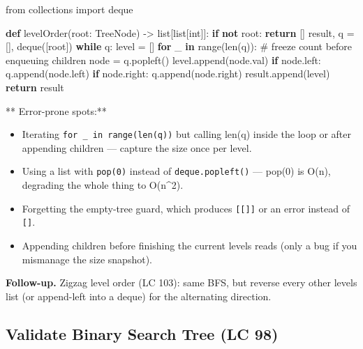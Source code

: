 \documentclass[11pt]{article}
\providecommand{\tightlist}{\setlength{\itemsep}{1pt}\setlength{\parskip}{0pt}}
\newenvironment{Shaded}{\begin{snugshade}}{\end{snugshade}}
\newcommand{\BuiltInTok}[1]{\textcolor[rgb]{0.50,0.55,0.55}{#1}}
\newcommand{\CommentTok}[1]{\textcolor[rgb]{0.48,0.49,0.49}{#1}}
\newcommand{\ControlFlowTok}[1]{\textcolor[rgb]{0.99,0.74,0.29}{\textbf{#1}}}
\newcommand{\ImportTok}[1]{\textcolor[rgb]{0.15,0.68,0.38}{#1}}
\newcommand{\KeywordTok}[1]{\textcolor[rgb]{0.81,0.81,0.76}{\textbf{#1}}}
\newcommand{\NormalTok}[1]{\textcolor[rgb]{0.81,0.81,0.76}{#1}}
\newcommand{\OperatorTok}[1]{\textcolor[rgb]{0.81,0.81,0.76}{#1}}
\begin{document}
\begin{Shaded}
\begin{Highlighting}[]
\ImportTok{from}\NormalTok{ collections }\ImportTok{import}\NormalTok{ deque}

\KeywordTok{def}\NormalTok{ levelOrder(root: TreeNode) }\OperatorTok{{-}\textgreater{}} \BuiltInTok{list}\NormalTok{[}\BuiltInTok{list}\NormalTok{[}\BuiltInTok{int}\NormalTok{]]:}
    \ControlFlowTok{if} \KeywordTok{not}\NormalTok{ root:}
        \ControlFlowTok{return}\NormalTok{ []}
\NormalTok{    result, q }\OperatorTok{=}\NormalTok{ [], deque([root])}
    \ControlFlowTok{while}\NormalTok{ q:}
\NormalTok{        level }\OperatorTok{=}\NormalTok{ []}
        \ControlFlowTok{for}\NormalTok{ \_ }\KeywordTok{in} \BuiltInTok{range}\NormalTok{(}\BuiltInTok{len}\NormalTok{(q)):          }\CommentTok{\# freeze count before enqueuing children}
\NormalTok{            node }\OperatorTok{=}\NormalTok{ q.popleft()}
\NormalTok{            level.append(node.val)}
            \ControlFlowTok{if}\NormalTok{ node.left:}
\NormalTok{                q.append(node.left)}
            \ControlFlowTok{if}\NormalTok{ node.right:}
\NormalTok{                q.append(node.right)}
\NormalTok{        result.append(level)}
    \ControlFlowTok{return}\NormalTok{ result}
\end{Highlighting}
\end{Shaded}

** Error-prone spots:**

\begin{itemize}
\tightlist
\item
  Iterating \texttt{for\ \_\ in\ range(len(q))} but calling len(q) inside the loop or after appending children --- capture the size once per level.
\item
  Using a list with \texttt{pop(0)} instead of \texttt{deque.popleft()} --- pop(0) is O(n), degrading the whole thing to O(n\^{}2).
\item
  Forgetting the empty-tree guard, which produces \texttt{{[}{[}{]}{]}} or an error instead of \texttt{{[}{]}}.
\item
  Appending children before finishing the current level\textquotesingle s reads (only a bug if you mismanage the size snapshot).
\end{itemize}

\textbf{Follow-up.} Zigzag level order (LC 103): same BFS, but reverse every other level\textquotesingle s list (or append-left into a deque) for the alternating direction.

\subsection{Validate Binary Search Tree (LC 98)}\label{validate-binary-search-tree-lc-98}
\end{document}
